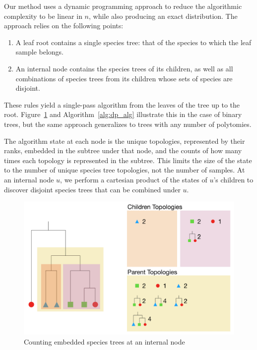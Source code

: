\documentclass{article}
\begin{document}
Our method uses a dynamic programming approach to reduce the algorithmic
complexity to be linear in $n$, while also producing an exact distribution.
The approach relies on the following points:
\begin{enumerate}
    \item A leaf root contains a single species tree: that of the species to
        which the leaf sample belongs.
    \item An internal node contains the species trees of its children, as
        well as all combinations of species trees from its children whose
        sets of species are disjoint.
\end{enumerate}
These rules yield a single-pass algorithm from the leaves of the tree
up to the root. Figure~\ref{fig:dp_alg} and Algorithm~\ref{alg:dp_alg}
illustrate this in the case of binary trees, but the same approach generalizes
to trees with any number of polytomies.

The algorithm state at each node is the unique topologies,
represented by their ranks, embedded in the subtree under that node, and the
counts of how many times each topology is represented in the subtree. This
limits the size of the state to the number of unique species tree topologies,
not the number of samples. At an internal node $u$, we perform a cartesian
product of the states of $u$'s children to discover disjoint species trees that
can be combined under $u$.

\begin{figure}[H]
    \includegraphics[scale=0.5]{dp_alg}
    \centering
    \caption{Counting embedded species trees at an internal node}
    \label{fig:dp_alg}
\end{figure}
\end{document}
